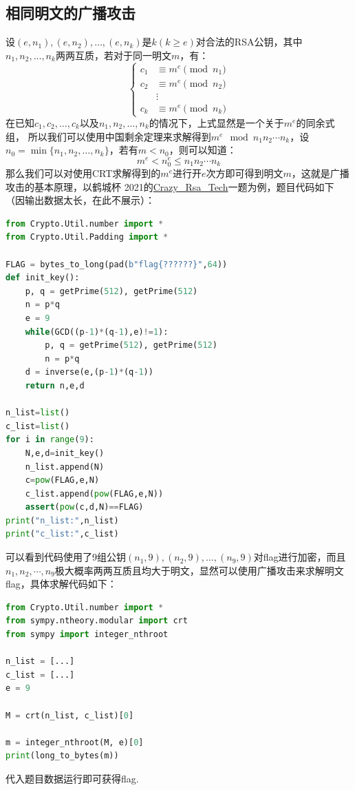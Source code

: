 \documentclass{book}
\numberwithin{equation}{subsubsection}
\begin{document}
\subsection{相同明文的广播攻击}
设$(e, n_1), (e, n_2), \ldots, (e, n_k)$是$k(k\ge e)$对合法的RSA公钥，其中$n_1,n_2,\ldots,n_k$两两互质，若对于同一明文$m$，有：
\begin{equation}
    \begin{cases}
        c_1&\equiv m^{e}\pmod{n_1}\\
        c_2&\equiv m^{e}\pmod{n_2}\\
        &\vdots\\
        c_k&\equiv m^{e}\pmod{n_k}
    \end{cases}
    \nonumber
\end{equation}
在已知$c_1, c_2, \ldots, c_k$以及$n_1, n_2, \ldots, n_k$的情况下，上式显然是一个关于$m^e$的同余式组，
所以我们可以使用中国剩余定理来求解得到$m^e\mod{n_1n_2\cdots n_k}$，设$n_0=\min\{n_1, n_2, \ldots, n_k\}$，若有$m<n_0$，则可以知道：
\begin{equation}
    m^e < n_0^e \le n_1n_2\cdots n_k
    \nonumber
\end{equation}
那么我们可以对使用CRT求解得到的$m^e$进行开$e$次方即可得到明文$m$，这就是广播攻击的基本原理，以鹤城杯 2021的\href{https://www.nssctf.cn/problem/452}{Crazy\_Rsa\_Tech}一题为例，题目代码如下（因输出数据太长，在此不展示）：
\begin{lstlisting}[language=Python,basicstyle=\ttfamily,breaklines=true,keywordstyle=\bfseries\color{blue}]
from Crypto.Util.number import *
from Crypto.Util.Padding import *

FLAG = bytes_to_long(pad(b"flag{??????}",64))
def init_key():
    p, q = getPrime(512), getPrime(512)
    n = p*q
    e = 9
    while(GCD((p-1)*(q-1),e)!=1):
        p, q = getPrime(512), getPrime(512)
        n = p*q
    d = inverse(e,(p-1)*(q-1))
    return n,e,d

n_list=list()
c_list=list()
for i in range(9):
    N,e,d=init_key()
    n_list.append(N)
    c=pow(FLAG,e,N)
    c_list.append(pow(FLAG,e,N))
    assert(pow(c,d,N)==FLAG)
print("n_list:",n_list)
print("c_list:",c_list)
\end{lstlisting}
可以看到代码使用了9组公钥$(n_1,9), (n_2,9), \ldots, (n_9,9)$对flag进行加密，而且$n_1,n_2,\cdots,n_9$极大概率两两互质且均大于明文，显然可以使用广播攻击来求解明文flag，具体求解代码如下：
\begin{lstlisting}[language=Python,basicstyle=\ttfamily,breaklines=true,keywordstyle=\bfseries\color{blue}]
from Crypto.Util.number import *
from sympy.ntheory.modular import crt
from sympy import integer_nthroot

n_list = [...]
c_list = [...]
e = 9

M = crt(n_list, c_list)[0]

m = integer_nthroot(M, e)[0]
print(long_to_bytes(m))
\end{lstlisting}
代入题目数据运行即可获得flag.\par
\end{document}

